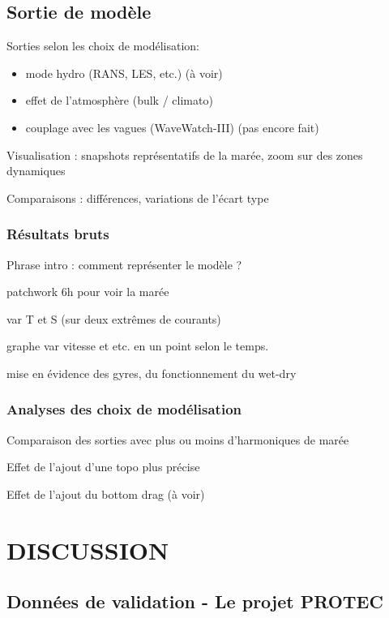 \documentclass[10pt,a4paper,titlepage]{article}
\begin{document}
    \subsection{Sortie de modèle}
    \label{sub:sortie_modele}
    Sorties selon les choix de modélisation:
    \begin{itemize}
        \item mode hydro (RANS, LES, etc.) (à voir)
        \item effet de l'atmosphère (bulk / climato)
        \item couplage avec les vagues (WaveWatch-III) (pas encore fait)
    \end{itemize}
    
    Visualisation : snapshots représentatifs de la marée, zoom sur des zones dynamiques
    
    Comparaisons : différences, variations de l'écart type
    
    \subsubsection{Résultats bruts}
    Phrase intro : comment représenter le modèle ?
    
    patchwork 6h pour voir la marée
    
    var T et S (sur deux extrêmes de courants)
    
    graphe var vitesse et etc. en un point selon le temps.
    
    mise en évidence des gyres, du fonctionnement du wet-dry
    
    \subsubsection{Analyses des choix de modélisation}
    Comparaison des sorties avec plus ou moins d'harmoniques de marée
    
    Effet de l'ajout d'une topo plus précise
    
    Effet de l'ajout du bottom drag (à voir)
    
    \newpage
    
    \section{DISCUSSION}
    \label{sec:discussion}
    
    
    
    \subsection{Données de validation - Le projet PROTEC}
    \label{subsub:protec}
    
\end{document}
